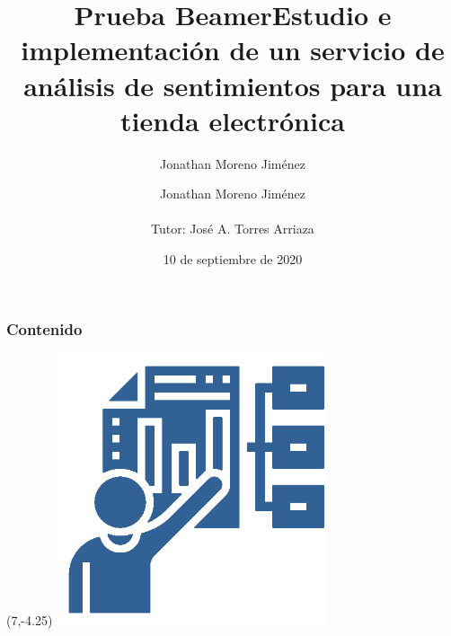 \documentclass[10pt]{beamer}
\author{Jonathan Moreno Jiménez}
\title{Prueba Beamer}
\author[Jonathan Moreno Jiménez]{\large Jonathan Moreno Jiménez  \\ \textcolor{white}{a} \\ \small Tutor: José A. Torres Arriaza}
\title[Trabajo fin de grado]{Estudio e implementación de un servicio de análisis de sentimientos para una tienda electrónica}
\date{10 de septiembre de 2020}
\begin{document}
\begin{frame}
\frametitle{Contenido}
\vspace{-5mm}
\vspace{5mm}
\begin{textblock}{5}(7,-4.25)
	\includegraphics[width = 0.6\textwidth]{Figuras/negocios.png}
\end{textblock}
\end{frame}
\end{document}
